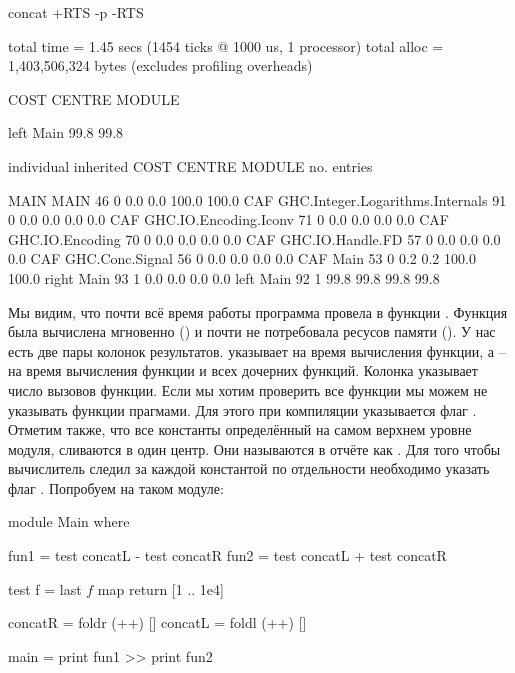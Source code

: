 \begin{code}
	   concat +RTS -p -RTS

	total time  =        1.45 secs   (1454 ticks @ 1000 us, 1 processor)
	total alloc = 1,403,506,324 bytes  (excludes profiling overheads)

COST CENTRE MODULE  %

left        Main     99.8   99.8


                                                                 individual     inherited
COST CENTRE MODULE                             no.   entries  %

MAIN        MAIN                                46         0    0.0    0.0   100.0  100.0
 CAF        GHC.Integer.Logarithms.Internals    91         0    0.0    0.0     0.0    0.0
 CAF        GHC.IO.Encoding.Iconv               71         0    0.0    0.0     0.0    0.0
 CAF        GHC.IO.Encoding                     70         0    0.0    0.0     0.0    0.0
 CAF        GHC.IO.Handle.FD                    57         0    0.0    0.0     0.0    0.0
 CAF        GHC.Conc.Signal                     56         0    0.0    0.0     0.0    0.0
 CAF        Main                                53         0    0.2    0.2   100.0  100.0
  right     Main                                93         1    0.0    0.0     0.0    0.0
  left      Main                                92         1   99.8   99.8    99.8   99.8
\end{code}

Мы видим, что почти всё время работы программа провела в функции
. Функция  была вычислена мгновенно ()
и почти не потребовала ресусов памяти (). У нас есть две пары
колонок результатов.  указывает на время вычисления
функции, а  -- на время вычисления функции и всех дочерних
функций. Колонка  указывает число вызовов функции. Если мы
хотим проверить все функции мы можем не указывать функции прагмами. Для
этого при компиляции указывается флаг . Отметим также, что
все константы определённый на самом верхнем уровне модуля, сливаются в
один центр. Они называются в отчёте как . Для того чтобы
вычислитель следил за каждой константой по отдельности необходимо
указать флаг . Попробуем на таком модуле:


\begin{code}
module Main where

fun1 = test concatL - test concatR
fun2 = test concatL + test concatR

test f = last $ f $ map return [1 .. 1e4]

concatR = foldr (++) [] 
concatL = foldl (++) [] 

main = print fun1 >> print fun2
\end{code}

